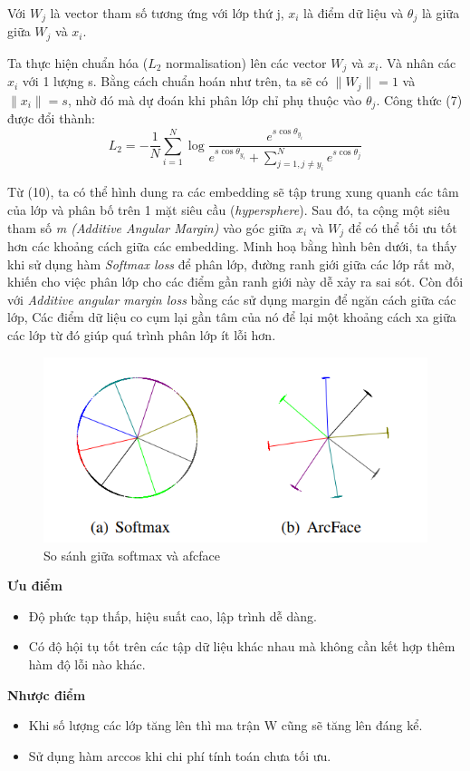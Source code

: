 Với $W_j$ là vector tham số tương ứng với lớp thứ j, $x_i$ là điểm dữ liệu và $\theta_j$ là giữa giữa $W_j$ và $x_i$.  

Ta thực hiện chuẩn hóa ($L_2$ normalisation) lên các vector $W_j$ và $x_i$. Và nhân các $x_i$ với 1 lượng s. Bằng cách chuẩn hoán như trên, ta sẽ có $\|W_j\|=1$ và $\|x_i\|=s$, nhờ đó mà dự đoán khi phân lớp chỉ phụ thuộc vào $\theta_j$. Công thức (7) được đổi thành:  
\begin{equation}
L_2=-\frac{1}{N}\sum_{i=1}^{N}{\log{\frac{e^{s\cos{\theta_{y_i}}}}{e^{s\cos{\theta_{y_i}}} + \sum_{j=1,j\neq y_i}^{N}{e^{s\cos{\theta_{j}}}}}}}
\end{equation}

Từ (10), ta có thể hình dung ra các embedding sẽ tập trung xung quanh các tâm của lớp và phân bố trên 1 mặt siêu cầu (\textit{hypersphere}). Sau đó, ta cộng một siêu tham số \textit{m (Additive Angular Margin)} vào góc giữa $x_i$ và $W_j$ để có thể tối ưu tốt hơn các khoảng cách giữa các embedding. Minh hoạ bằng hình bên dưới, ta thấy khi sử dụng hàm \textit{Softmax loss} để phân lớp, đường ranh giới giữa các lớp rất mờ, khiến cho việc phân lớp cho các điểm gần ranh giới này dễ xảy ra sai sót. Còn đối với \textit{Additive angular margin loss} bằng các sử dụng margin để ngăn cách giữa các lớp, Các điểm dữ liệu co cụm lại gần tâm của nó để  lại một khoảng cách xa giữa các lớp từ đó giúp quá trình phân lớp ít lỗi hơn.

\begin{figure}[H]
    \begin{center}
        \includegraphics[scale=0.5]{images/ex2/softmax-vs-arcface}
        \caption{So sánh giữa softmax và afcface}
    \end{center}
\end{figure}

\textbf{Ưu điểm}
\begin{itemize}
	\item Độ phức tạp thấp, hiệu suất cao, lập trình dễ dàng.
	\item Có độ hội tụ tốt trên các tập dữ liệu khác nhau mà không cần kết hợp thêm hàm độ lỗi nào khác.
\end{itemize}
\textbf{Nhược điểm}
\begin{itemize}
	\item Khi số lượng các lớp tăng lên thì ma trận W cũng sẽ tăng lên đáng kể.
	\item Sử dụng hàm arccos khi chi phí tính toán chưa tối ưu.
\end{itemize}

